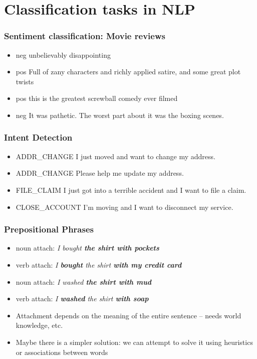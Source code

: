 



\author{}
\institute{}


\section{Classification tasks in NLP}
\frame{\tableofcontents[currentsection]}

\begin{frame}
\frametitle{Sentiment classification: Movie reviews}
\begin{itemize}
\item {\color{red} neg} unbelievably disappointing 
\item {\color{green} pos} Full of zany characters and richly applied satire, and some great plot twists
\item {\color{green} pos} this is the greatest screwball comedy ever filmed  
\item {\color{red} neg} It was pathetic. The worst part about it was the boxing scenes.
\end{itemize}
\end{frame}

\begin{frame}
\frametitle{Intent Detection}
\begin{itemize}
\item {\color{blue} ADDR\_CHANGE} I just moved and want to change my address. 
\item {\color{blue} ADDR\_CHANGE} Please help me update my address.  
\item {\color{blue} FILE\_CLAIM} I just got into a terrible accident and I want to file a claim. 
\item {\color{blue} CLOSE\_ACCOUNT} I'm moving and I want to disconnect my service.
\end{itemize}
\end{frame}

\begin{frame}
\frametitle{Prepositional Phrases}
\begin{itemize}[<+->]
\item noun attach: {\em I bought \textbf{the shirt with pockets}}
\item verb attach: {\em I \textbf{bought} the shirt \textbf{with my credit card}}
\item noun attach: {\em I washed \textbf{the shirt with mud}}
\item verb attach: {\em I \textbf{washed} the shirt \textbf{with soap}}
\item Attachment depends on the meaning of the entire sentence -- needs world knowledge, etc.
\item Maybe there is a simpler solution: we can attempt to solve it using heuristics or associations between words
\end{itemize}
\end{frame}


